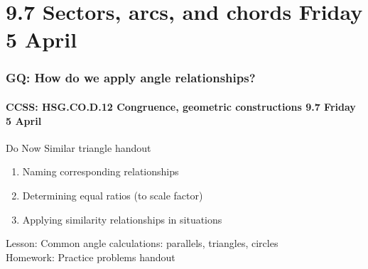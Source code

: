 \documentclass{beamer}
\begin{document}
\section{9.7 Sectors, arcs, and chords Friday 5 April}
  \frame
  {
    \frametitle{GQ: How do we apply angle relationships?}
    \framesubtitle{CCSS: HSG.CO.D.12 Congruence, geometric constructions \hfill \alert{9.7 Friday 5 April}}

    \begin{block}{Do Now Similar triangle handout}
      \begin{enumerate}
        \item Naming corresponding relationships
        \item Determining equal ratios (to scale factor)
        \item Applying similarity relationships in situations
      \end{enumerate}
    \end{block}
    Lesson: Common angle calculations: parallels, triangles, circles\\
    Homework: Practice problems handout
  }
\end{document}

